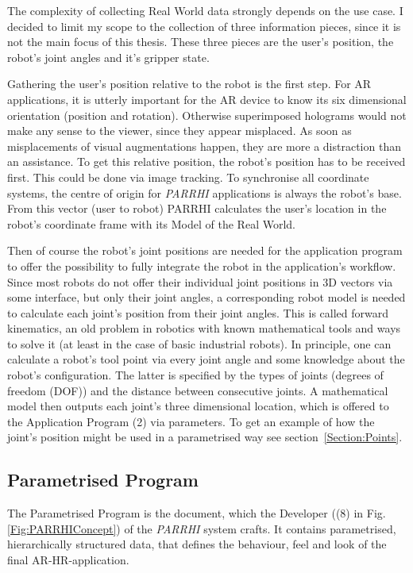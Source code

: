 The complexity of collecting Real World data strongly depends on the use case. I decided to limit my scope to the collection of three information pieces, since it is not the main focus of this thesis. These three pieces are the user's position, the robot's joint angles and it's gripper state. 

Gathering the user's position relative to the robot is the first step. For AR applications, it is utterly important for the AR device to know its six dimensional orientation (position and rotation). Otherwise superimposed holograms would not make any sense to the viewer, since they appear misplaced. As soon as misplacements of visual augmentations happen, they are more a distraction than an assistance. To get this relative position, the robot's position has to be received first. This could be done via image tracking. To synchronise all coordinate systems, the centre of origin for \textit{PARRHI} applications is always the robot's base. From this vector (user to robot) PARRHI calculates the user's location in the robot's coordinate frame with its Model of the Real World.

Then of course the robot's joint positions are needed for the application program to offer the possibility to fully integrate the robot in the application's workflow. Since most robots do not offer their individual joint positions in 3D vectors via some interface, but only their joint angles, a corresponding robot model is needed to calculate each joint's position from their joint angles. This is called forward kinematics, an old problem in robotics with known mathematical tools and ways to solve it (at least in the case of basic industrial robots). In principle, one can calculate a robot's tool point via every joint angle and some knowledge about the robot's configuration. The latter is specified by the types of joints (degrees of freedom (DOF)) and the distance between consecutive joints. A mathematical model then outputs each joint's three dimensional location, which is offered to the Application Program (2) via parameters. To get an example of how the joint's position might be used in a parametrised way see section~\ref{Section:Points}.

\subsection{Parametrised Program}
\label{Section:ParametrisedProgram}
The Parametrised Program is the document, which the Developer ((8) in Fig. \ref{Fig:PARRHIConcept}) of the \textit{PARRHI} system crafts. It contains parametrised, hierarchically structured data, that defines the behaviour, feel and look of the final AR-HR-application. 

